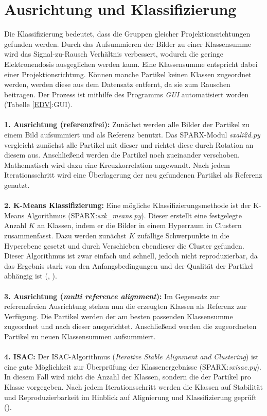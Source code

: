 \section{Ausrichtung und Klassifizierung} %
\label{sec:klassifizierung}

Die Klassifizierung bedeutet, dass die Gruppen gleicher Projektionsrichtungen gefunden werden.
Durch das Aufsummieren der Bilder zu einer Klassensumme wird das Signal-zu-Rausch Verhältnis verbessert, wodurch die geringe Elektronendosis ausgeglichen werden kann.
Eine Klassensumme entspricht dabei einer Projektionsrichtung.
Können manche Partikel keinen Klassen zugeordnet werden, werden diese aus dem Datensatz entfernt, da sie zum Rauschen beitragen.
Der Prozess ist mithilfe des Programms \textit{GUI} automatisiert worden (Tabelle \ref{EDV}:GUI).
\\
\\
\textbf{1. Ausrichtung (referenzfrei):}
Zunächst werden alle Bilder der Partikel zu einem Bild aufsummiert und als Referenz benutzt.
Das SPARX-Modul \textit{sxali2d.py} vergleicht zunächst alle Partikel mit dieser und richtet diese durch Rotation an diesem aus.
Anschließend werden die Partikel noch zueinander verschoben.
Mathematisch wird dazu eine Kreuzkorrelation angewandt.
Nach jedem Iterationsschritt wird eine Überlagerung der neu gefundenen Partikel als Referenz genutzt.
\\
\\
\textbf{2. K-Means Klassifizierung:}
Eine mögliche Klassifizierungsmethode ist der K-Means Algorithmus (SPARX:\textit{sxk\_means.py}).
Dieser erstellt eine festgelegte Anzahl $K$ an Klassen, indem er die Bilder in einem Hyperraum in Clustern zusammenfasst.
Dazu werden zunächst $K$ zufällige Schwerpunkte in die Hyperebene gesetzt und durch Verschieben ebendieser die Cluster gefunden.
Dieser Algorithmus ist zwar einfach und schnell, jedoch nicht reproduzierbar, da das Ergebnis stark von den Anfangsbedingungen und der Qualität der Partikel abhängig ist (\cite{k_means}, \cite{2D_align}).
\\ 
\\
\textbf{3. Ausrichtung (\textit{multi reference alignment}):}
Im Gegensatz zur referenzfreien Ausrichtung stehen nun die erzeugten Klassen als Referenz zur Verfügung.
Die Partikel werden der am besten passenden Klassensumme zugeordnet und nach dieser ausgerichtet.
Anschließend werden die zugeordneten Partikel zu neuen Klassensummen aufsummiert.
\\ 
\\
\textbf{4. ISAC:}
Der ISAC-Algorithmus (\textit{Iterative Stable Alignment and Clustering}) ist eine gute Möglichkeit zur Überprüfung der Klassenergebnisse (SPARX:\textit{sxisac.py}).
In diesem Fall wird nicht die Anzahl der Klassen, sondern die der Partikel pro Klasse vorgegeben.
Nach jedem Iterationsschritt werden die Klassen auf Stabilität und Reproduzierbarkeit im Hinblick auf Alignierung und Klassifizierung geprüft (\cite{isac}).

\FloatBarrier